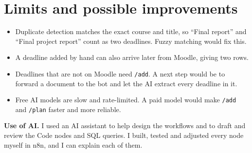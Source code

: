 \documentclass[10pt,a4paper]{article}
\newcommand{\cmd}[1]{\texttt{\small #1}}
\begin{document}
\section{Limits and possible improvements}

\begin{itemize}
  \item Duplicate detection matches the exact course and title, so ``Final report'' and ``Final project report'' count
  as two deadlines. Fuzzy matching would fix this.
  \item A deadline added by hand can also arrive later from Moodle, giving two rows.
  \item Deadlines that are not on Moodle need \cmd{/add}. A next step would be to forward a document to the bot and let the
  AI extract every deadline in it.
  \item Free AI models are slow and rate-limited. A paid model would make \cmd{/add} and \cmd{/plan} faster and more
  reliable.
\end{itemize}

\textbf{Use of AI.} I used an AI assistant to help design the workflows and to draft and review the Code nodes and SQL
queries. I built, tested and adjusted every node myself in n8n, and I can explain each of them.
\end{document}
